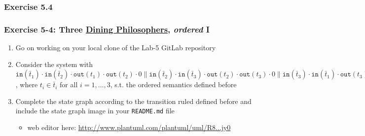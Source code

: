 \documentclass[presentation]{beamer}\mode<presentation>{\usetheme{AMSCesenaPurpleAndGold}}
\begin{document}
\subsubsection{Exercise 5.4}

\begin{frame}
\frametitle{Exercise 5-4: Three \href{https://en.wikipedia.org/wiki/Dining_philosophers_problem}{Dining Philosophers}, \emph{ordered} I}
    \begin{enumerate}
        \item Go on working on your local clone of the Lab-5 GitLab repository
        
        \vfill
        
        \item Consider the system with \alert{$\mathtt{in}(\bar{t}_1) \cdot \mathtt{in}(\bar{t}_2) \cdot \mathtt{out}(t_1) \cdot \mathtt{out}(t_2) \cdot 0 \parallel \mathtt{in}(\bar{t}_2) \cdot \mathtt{in}(\bar{t}_3) \cdot \mathtt{out}(t_2) \cdot \mathtt{out}(t_3) \cdot 0 \parallel \mathtt{in}(\bar{t}_3) \cdot \mathtt{in}(\bar{t}_1) \cdot \mathtt{out}(t_3) \cdot \mathtt{out}(t_1) \cdot 0 \parallel t_1 \cup t_2 \cup t_3$}, where $t_i \in \bar{t}_i$ for all $i = 1,\ldots,3$, s.t. the \alert{ordered} \linda{} semantics defined before
        
        \vfill
    
        \item Complete the state graph according to the transition ruled defined before and include the state graph image in your \alert{\texttt{README.md}} file
        \begin{itemize}
            \item web editor here: \href{
                http://www.plantuml.com/plantuml/uml/R8-nJiCm441tVyMDBLAhq15L4Q85YQLBnTHsiEAZM77ioBu00J4qOU17MFWMlg9VWXDgPAHiJtVlMRvBHznILIZcSgbBRda1IxpdbQ8ResajNn1cIRHS4oViLrGh14bSoSmDrojU82nCPILQzY050XObrI3GPLQM98rcKUcwf-6L0LpnBDzRKscnCChO-VnQ2wdtQGf6oKSSCfR8XJ9PxXsBOiYuq_XSUaBXdHgLCa_iZR7DsGucanHSmleFUBW0gKVq_Nvi3kDfm6OyDHMDo0y3TRDagm6E7vyGUG7RI0pKdfB_KHkYwFKeFuJeb7KZ3ryTD05QvfBVIyxx0_fkgpUtAm-xl-NifncpnuaO1g9mdrFu2F6_dOeRq4191otDtc0ZxasapDDujICB0ybEGVK4-kRDUxO9n2l4AuiUuWfnVPlWYpMBKUf6QuBTHmdjd301OfHCW9Xw9ZZpXtGS7mcOuFPHifG4YELkpYkBjMU2D-TNPBWNqyLJ7MRH1QXMp09KT_Exy056XCq8BJsWpGS2zo3RoPzVN_QneOVUWkDerO-VAn9t55CBjTlTXAaKP9KYceWxYwSLr29555DbVRlAn5sbNK5rSszNvNT7p767wtGfn2rVhr3TmX3eNREjUlJzCJvN9N8lpWKrI2g_3MPztR9uyKIfN2odNhkirRSmQubSlDvPBYmBhpbtuYN-quqv8g_2IbZsyy9_4HrRspHwS_lUNuoY5_lAd47cV5Hnjf-lniLuH_V0OnXqW4k6_-aRGJl3kAnnhO0hYeshYXFdPht6EQlPE2V03TyxXtq_QLpq-ZOCjD3tyByv1-CN5HzuBYdkRTQRkA8wSLKX7U3yBC2T-j3kVoATdZu-txTl_jy0
            }{http://www.plantuml.com/plantuml/uml/R8...jy0}
        \end{itemize}
        

\end{enumerate}
\end{frame}
\end{document}
